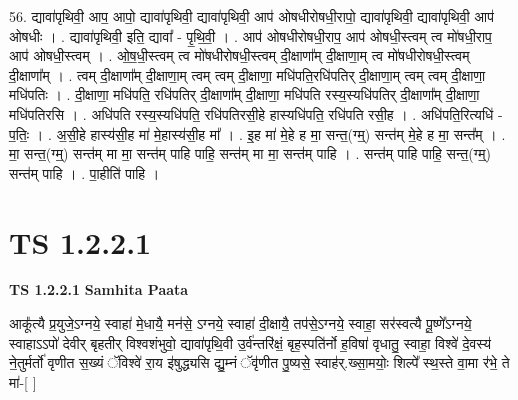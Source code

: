 \documentclass[17pt]{extarticle}
\begin{document}
56. द्यावा॑पृथिवी॒ आप॒ आपो॒ द्यावा॑पृथिवी॒ द्यावा॑पृथिवी॒ आप॑ ओषधीरोषधी॒रापो॒ द्यावा॑पृथिवी॒ द्यावा॑पृथिवी॒ आप॑ ओषधीः । . द्यावा॑पृथिवी॒ इति॒ द्यावा᳚ - पृ॒थि॒वी॒ । . आप॑ ओषधीरोषधी॒राप॒ आप॑ ओषधी॒स्त्वम् त्व मो॑षधी॒राप॒ आप॑ ओषधी॒स्त्वम् । . ओ॒ष॒धी॒स्त्वम् त्व मो॑षधीरोषधी॒स्त्वम् दी॒क्षाणा᳚म् दी॒क्षाणा॒म् त्व मो॑षधीरोषधी॒स्त्वम् दी॒क्षाणा᳚म् । . त्वम् दी॒क्षाणा᳚म् दी॒क्षाणा॒म् त्वम् त्वम् दी॒क्षाणा॒ मधि॑पति॒रधि॑पतिर् दी॒क्षाणा॒म् त्वम् त्वम् दी॒क्षाणा॒ मधि॑पतिः । . दी॒क्षाणा॒ मधि॑पति॒ रधि॑पतिर् दी॒क्षाणा᳚म् दी॒क्षाणा॒ मधि॑पति रस्य॒स्यधि॑पतिर् दी॒क्षाणा᳚म् दी॒क्षाणा॒ मधि॑पतिरसि । . अधि॑पति रस्य॒स्यधि॑पति॒ रधि॑पतिरसी॒हे हास्यधि॑पति॒ रधि॑पति रसी॒ह । . अधि॑पति॒रित्यधि॑ - प॒तिः॒ । . अ॒सी॒हे हास्य॑सी॒ह मा॑ मे॒हास्य॑सी॒ह मा᳚ । . इ॒ह मा॑ मे॒हे ह मा॒ सन्त॒(ग्म्॒) सन्त॑म् मे॒हे ह मा॒ सन्त᳚म् । . मा॒ सन्त॒(ग्म्॒) सन्त॑म् मा मा॒ सन्त॑म् पाहि पाहि॒ सन्त॑म् मा मा॒ सन्त॑म् पाहि । . सन्त॑म् पाहि पाहि॒ सन्त॒(ग्म्॒) सन्त॑म् पाहि । . पा॒हीति॑ पाहि । \newline
\pagebreak
{}
\section*{ TS 1.2.2.1 }

\textbf{TS 1.2.2.1 } \newline
\textbf{Samhita Paata} \newline

आकू᳚त्यै प्र॒युजे॒ऽग्नये॒ स्वाहा॑ मे॒धायै॒ मन॑से॒ ऽग्नये॒ स्वाहा॑ दी॒क्षायै॒ तप॑से॒ऽग्नये॒ स्वाहा॒ सर॑स्वत्यै पू॒ष्णे᳚ऽग्नये॒ स्वाहाऽऽपो॑ देवीर् बृहतीर् विश्वशंभुवो॒ द्यावा॑पृथि॒वी उ॒र्व॑न्तरि॑क्षं॒ बृह॒स्पति॑र्नो ह॒विषा॑ वृधातु॒ स्वाहा॒ विश्वे॑ दे॒वस्य॑ ने॒तुर्मर्तो॑ वृणीत स॒ख्यं ॅविश्वे॑ रा॒य इ॑षुद्ध्यसि द्यु॒म्नं ॅवृ॑णीत पु॒ष्यसे॒ स्वाह॑र्.ख्सा॒मयोः॒ शिल्पे᳚ स्थ॒स्ते वा॒मा र॑भे॒ ते मा॑-[ ] \newline
\end{document}
